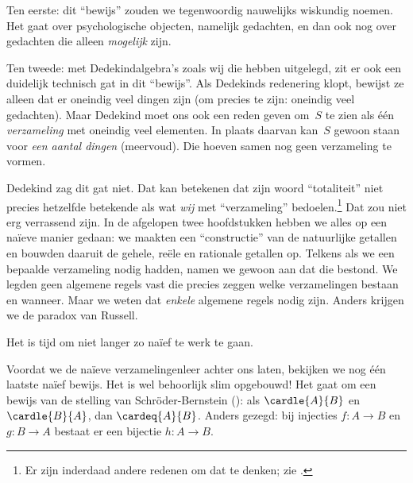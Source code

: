 \documentclass[openany]{memoir}
\begin{document}
Ten eerste: dit ``bewijs'' zouden we tegenwoordig nauwelijks wiskundig
noemen. Het gaat over psychologische objecten, namelijk gedachten, en
dan ook nog over gedachten die alleen \emph{mogelijk} zijn.

Ten tweede: met Dedekindalgebra's zoals wij die hebben uitgelegd, zit er
ook een duidelijk technisch gat in dit ``bewijs''. Als Dedekinds
redenering klopt, bewijst ze alleen dat er oneindig veel dingen zijn
(om precies te zijn: oneindig veel gedachten). Maar Dedekind moet ons
ook een reden geven om~$S$ te zien als één \emph{verzameling} met
oneindig veel elementen. In plaats daarvan kan~$S$ gewoon staan voor
\emph{een aantal dingen} (meervoud). Die hoeven samen nog geen
verzameling te vormen.

Dedekind zag dit gat niet. Dat kan betekenen dat zijn woord
``totaliteit'' niet precies hetzelfde betekende als wat \emph{wij} met
``verzameling'' bedoelen.\footnote{Er zijn inderdaad andere redenen om
dat te denken; zie \citet[p.~23]{Potter2004}.} Dat zou niet erg
verrassend zijn. In de afgelopen twee hoofdstukken hebben we alles op
een na\"ieve manier gedaan: we maakten een ``constructie'' van de
natuurlijke getallen en bouwden daaruit de gehele, reële en rationale
getallen op. Telkens als we een bepaalde verzameling nodig hadden,
namen we gewoon aan dat die bestond. We legden geen algemene regels
vast die precies zeggen welke verzamelingen bestaan en wanneer. Maar we
weten dat \emph{enkele} algemene regels nodig zijn. Anders krijgen we
de paradox van Russell.

Het is tijd om niet langer zo na\"ief te werk te gaan.
\endgroup

\begingroup
\def\olfilename{OLP-0054}
\def\olfilepath{content/sets-functions-relations/infinite/}
\hypertarget{unit-OLP-0054}{}


Voordat we de na\"ieve verzamelingenleer achter ons laten, bekijken we
nog één laatste na\"ief bewijs. Het is wel behoorlijk slim opgebouwd!
Het gaat om een bewijs van de stelling van Schr\"oder-Bernstein
(): als
$\cardle{A}{B}$ en $\cardle{B}{A}$, dan $\cardeq{A}{B}$. Anders
gezegd: bij injecties $f \colon A \to B$ en $g \colon B \to A$
bestaat er een bijectie $h \colon A \to B$.
\end{document}

